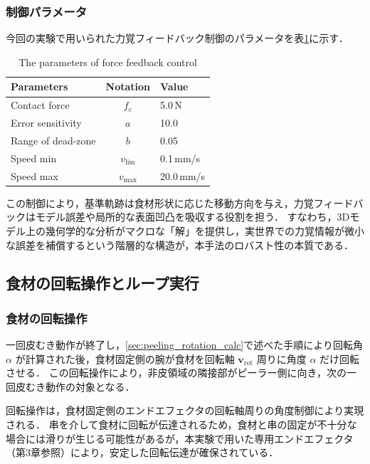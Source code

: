 \subsubsection{制御パラメータ}

今回の実験で用いられた力覚フィードバック制御のパラメータを表\ref{tab:peeling_force_params}に示す．

\begin{table}[ht]
  \centering
  \caption{The parameters of force feedback control}
  \label{tab:peeling_force_params}
  \begin{tabular}{@{}lcl@{}}
    \toprule
    Parameters & Notation & Value \\
    \midrule
    Contact force & $f_c$ & 5.0\,N \\
    Error sensitivity & $a$ & 10.0 \\
    Range of dead-zone & $b$ & 0.05 \\
    Speed min & $v_{\mathrm{lim}}$ & 0.1\,mm/s \\
    Speed max & $v_{\mathrm{max}}$ & 20.0\,mm/s \\
    \bottomrule
  \end{tabular}
\end{table}

この制御により，基準軌跡は食材形状に応じた移動方向を与え，力覚フィードバックはモデル誤差や局所的な表面凹凸を吸収する役割を担う．
すなわち，3Dモデル上の幾何学的な分析がマクロな「解」を提供し，実世界での力覚情報が微小な誤差を補償するという階層的な構造が，本手法のロバスト性の本質である．

\subsection{食材の回転操作とループ実行}
\label{sec:peeling_loop_peel_motion}

\subsubsection{食材の回転操作}

一回皮むき動作が終了し，\ref{sec:peeling_rotation_calc}で述べた手順により回転角 $\alpha$ が計算された後，食材固定側の腕が食材を回転軸 $\mathbf{v}_{\mathrm{rot}}$ 周りに角度 $\alpha$ だけ回転させる．
この回転操作により，非皮領域の隣接部がピーラー側に向き，次の一回皮むき動作の対象となる．

回転操作は，食材固定側のエンドエフェクタの回転軸周りの角度制御により実現される．
串を介して食材に回転が伝達されるため，食材と串の固定が不十分な場合には滑りが生じる可能性があるが，本実験で用いた専用エンドエフェクタ（第3章参照）により，安定した回転伝達が確保されている．


